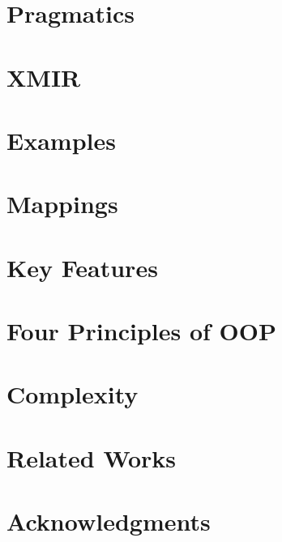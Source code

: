 \documentclass[sigplan,nonacm,natbib=false]{acmart}
\theoremstyle{theorems}
\begin{document}
\section{Pragmatics}
\label{sec:pragmatics}


\section{XMIR}
\label{sec:xmir}


\section{Examples}
\label{sec:examples}


\section{Mappings}
\label{sec:mappings}


\section{Key Features}
\label{sec:features}


\section{Four Principles of OOP}
\label{sec:four}


\section{Complexity}
\label{sec:complexity}


\section{Related Works}
\label{sec:related}


\section{Acknowledgments}


\printbibliography

\clearpage
\end{document}
